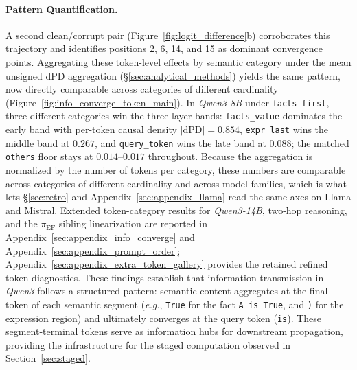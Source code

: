 \documentclass[11pt]{article}
\begin{document}
\paragraph{Pattern Quantification.} A second clean/corrupt pair (Figure~\ref{fig:logit_difference}b) corroborates this trajectory and identifies positions 2, 6, 14, and 15 as dominant convergence points. Aggregating these token-level effects by semantic category under the mean unsigned dPD aggregation (§\ref{sec:analytical_methods}) yields the same pattern, now directly comparable across categories of different cardinality (Figure~\ref{fig:info_converge_token_main}). In \textit{Qwen3-8B} under \texttt{facts\_first}, three different categories win the three layer bands: \texttt{facts\_value} dominates the early band with per-token causal density $\overline{|\mathrm{dPD}|} = 0.854$, \texttt{expr\_last} wins the middle band at $0.267$, and \texttt{query\_token} wins the late band at $0.088$; the matched \texttt{others} floor stays at $0.014$--$0.017$ throughout. Because the aggregation is normalized by the number of tokens per category, these numbers are comparable across categories of different cardinality and across model families, which is what lets §\ref{sec:retro} and Appendix~\ref{sec:appendix_llama} read the same axes on Llama and Mistral. Extended token-category results for \textit{Qwen3-14B}, two-hop reasoning, and the $\pi_{\mathrm{EF}}$ sibling linearization are reported in Appendix~\ref{sec:appendix_info_converge} and Appendix~\ref{sec:appendix_prompt_order}; Appendix~\ref{sec:appendix_extra_token_gallery} provides the retained refined token diagnostics.
These findings establish that information transmission in \textit{Qwen3} follows a structured pattern: semantic content aggregates at the final token of each semantic segment (\textit{e.g.}, \texttt{True} for the fact \texttt{A is True}, and \texttt{)} for the expression region) and ultimately converges at the query token (\texttt{is}). These segment-terminal tokens serve as information hubs for downstream propagation, providing the infrastructure for the staged computation observed in Section~\ref{sec:staged}. 
\end{document}
